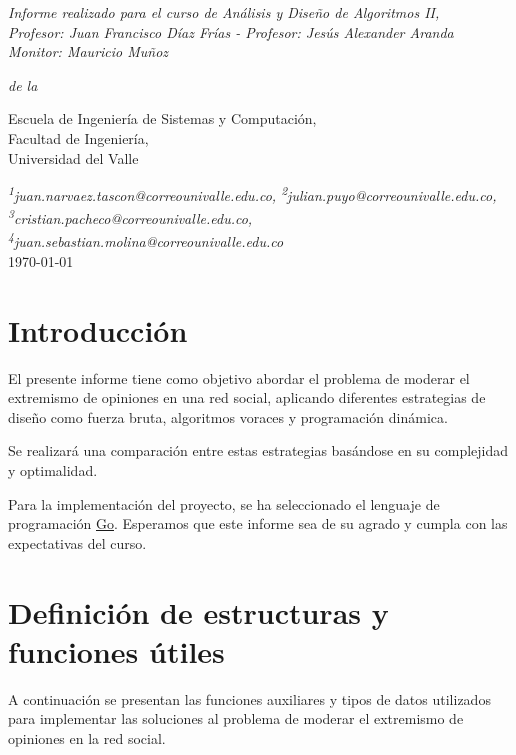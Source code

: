 \documentclass[letterpaper,10pt]{article}
\begin{document}
\begin{titlepage}
\begin{center}
    \vspace{2cm}
    
    \large \textit{
    Informe realizado para el curso de Análisis y Diseño de Algoritmos II,\\
    Profesor: Juan Francisco Díaz Frías - Profesor: Jesús Alexander Aranda\\
    Monitor: Mauricio Muñoz} 
    
    \vspace{0.3cm} %
    
    \textit{de la}
    
    \vspace{0.4cm}
    
    Escuela de Ingeniería de Sistemas y Computación,\\ 
    Facultad de Ingeniería,\\ 
    Universidad del Valle
    
    \vspace{1.0cm} 
    {\color{crtitle} \small \textit{  
        \textsuperscript{1}juan.narvaez.tascon@correounivalle.edu.co, 
        \textsuperscript{2}julian.puyo@correounivalle.edu.co, 
        \textsuperscript{3}cristian.pacheco@correounivalle.edu.co,
        \textsuperscript{4}juan.sebastian.molina@correounivalle.edu.co
    }}\\
    \today
     
    
    \end{center}
    \end{titlepage}
\newpage

\tableofcontents
\newpage
\section{Introducción}
\label{sec:introduccion}
El presente informe tiene como objetivo abordar el problema de moderar el extremismo de opiniones en una red social, aplicando diferentes estrategias de diseño como fuerza bruta, algoritmos voraces y programación dinámica.

Se realizará una comparación entre estas estrategias basándose en su complejidad y optimalidad.

Para la implementación del proyecto, se ha seleccionado el lenguaje de programación \href{https://go.dev/}{Go}. Esperamos que este informe sea de su agrado y cumpla con las expectativas del curso.
\section{Definición de estructuras y funciones útiles}
A continuación se presentan las funciones auxiliares y tipos de datos utilizados para implementar las soluciones al problema de moderar el extremismo de opiniones en la red social.
\end{document}
